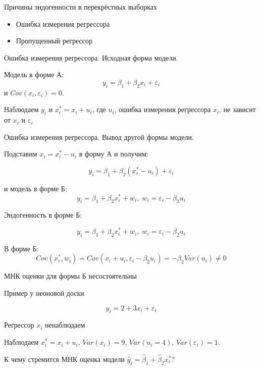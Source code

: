 \documentclass[ignorenonframetext,]{beamer}
\begin{document}
\begin{frame}{Причины эндогенности в перекрёстных выборках}

\begin{itemize}
\item
  Ошибка измерения регрессора
\item
  Пропущенный регрессор
\end{itemize}

\end{frame}

\begin{frame}{Ошибка измерения регрессора. Исходная форма модели.}

Модель в форме А: \[
y_i=\beta_1 + \beta_2 x_i + \varepsilon_i
\] и \(Cov(x_i, \varepsilon_i)=0\).

Наблюдаем \(y_i\) и \(x_i^*=x_i + u_i\), где \(u_i\), ошибка измерения
регрессора \(x_i\), не зависит от \(x_i\) и \(\varepsilon_i\)

\end{frame}

\begin{frame}{Ошибка измерения регрессора. Вывод другой формы модели.}

Подставим \(x_i=x_i^*-u_i\) в форму А и получим:

\[
y_i=\beta_1 + \beta_2 (x_i^*-u_i) + \varepsilon_i
\]

и модель в форме Б: \[
y_i=\beta_1 + \beta_2 x_i^*  + w_i, \; w_i=\varepsilon_i - \beta_2 u_i
\]

\end{frame}

\begin{frame}{Эндогенность в форме Б:}

\[
y_i=\beta_1 + \beta_2 x_i^*  + w_i, \; w_i=\varepsilon_i - \beta_2 u_i
\]

В форме Б: \[
Cov(x_i^*,w_i)=Cov(x_i+u_i,\varepsilon_i - \beta_2 u_i)=-\beta_2 Var(u_i) \neq 0
\]

МНК оценки для формы Б несостоятельны

\end{frame}

\begin{frame}{Пример у неоновой доски}

\[
y_i= 2 + 3x_i + \varepsilon_i
\]

Регрессор \(x_i\) ненаблюдаем

Наблюдаем \(x_i^*=x_i+u_i\), \(Var(x_i)=9\), \(Var(u_i=4)\),
\(Var(\varepsilon_i)=1\).

К чему стремится МНК оценка модели
\(\hat{y}_i = \hat{\beta}_1 + \hat{\beta}_2 x_i^*\)?

\end{frame}
\end{document}
